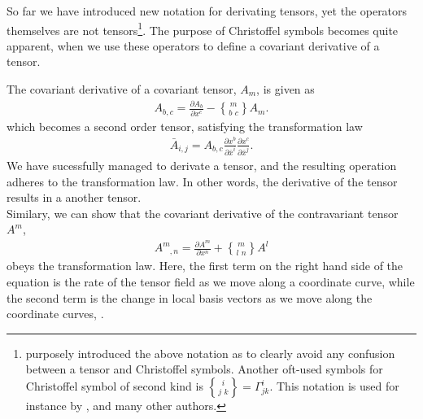 \documentclass[main.tex]{subfiles}
\begin{document}
So far we have introduced new notation for derivating tensors, yet the operators 
themselves are not tensors\footnote{\cite{Hei01} purposely introduced the above 
notation as to clearly avoid any confusion between a tensor and Christoffel symbols.
Another oft-used symbols for Christoffel symbol of second kind is ${i \brace j\,\,k} = 
\Gamma^i_{jk}$. This notation is used for instance by \cite{LR89}, and many other 
authors.}. The purpose of Christoffel symbols becomes quite apparent, when 
we use these operators to define a covariant derivative of a tensor. 

The covariant derivative of a covariant tensor, $A_m$, is given as
\begin{align*}
A_{b, c} = \frac{\partial A_b}{\partial x^c} - {m\brace b\,\,c} A_m.
\end{align*}
which becomes a second order tensor, satisfying the transformation law
\begin{align*}
\bar{A}_{i,j} = A_{b, c} \frac{\partial x^b}{\partial \bar{x}^i} 
				   \frac{\partial x^c}{\partial \bar{x}^j}.
\end{align*}
We have sucessfully managed to derivate a tensor, and the resulting
operation adheres to the transformation law. In other words, the derivative 
of the tensor results in a another tensor. 
\\

Similary, we can show that the covariant derivative of the contravariant tensor $A^m$, 
\begin{align*}
A^m_{\phantom{m},n} = \frac{\partial A^m}{\partial x^n} + {m\brace l\,\,n} A^l
\end{align*}
obeys the transformation law. Here, the first term on the right hand side of the 
equation is the rate of the tensor field as we move along a coordinate curve, while 
the second term is the change in local basis vectors as we move along the coordinate 
curves, \cite{Hei01}.
\end{document}

